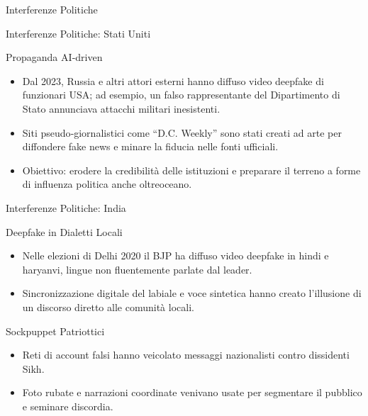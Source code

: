 \documentclass[12pt]{beamer}
\begin{document}
\begin{frame}
\Huge
\begin{center}
Interferenze Politiche
\end{center}
\end{frame}


\begin{frame}{Interferenze Politiche: Stati Uniti}
  \small
  \begin{alertblock}{Propaganda AI‐driven}
    \begin{itemize}
      \item Dal 2023, Russia e altri attori esterni hanno diffuso video deepfake di funzionari USA; ad esempio, un falso rappresentante del Dipartimento di Stato annunciava attacchi militari inesistenti.\cite{bond2024russian}
      \item Siti pseudo‐giornalistici come “D.C. Weekly” sono stati creati ad arte per diffondere fake news e minare la fiducia nelle fonti ufficiali.\cite{gao2024disinformation}
      \item Obiettivo: erodere la credibilità delle istituzioni e preparare il terreno a forme di influenza politica anche oltreoceano.
    \end{itemize}
  \end{alertblock}
\end{frame}

\begin{frame}{Interferenze Politiche: India}
  \small
  \begin{alertblock}{Deepfake in Dialetti Locali}
    \begin{itemize}
      \item Nelle elezioni di Delhi 2020 il BJP ha diffuso video deepfake in hindi e haryanvi, lingue non fluentemente parlate dal leader.\cite{christopher2020deepfakes}
      \item Sincronizzazione digitale del labiale e voce sintetica hanno creato l’illusione di un discorso diretto alle comunità locali.
    \end{itemize}
  \end{alertblock}
  \begin{alertblock}{Sockpuppet Patriottici}
    \begin{itemize}
      \item Reti di account falsi hanno veicolato messaggi nazionalisti contro dissidenti Sikh.\cite{menon2021sikhs}
      \item Foto rubate e narrazioni coordinate venivano usate per segmentare il pubblico e seminare discordia.
    \end{itemize}
  \end{alertblock}
\end{frame}
\end{document}
